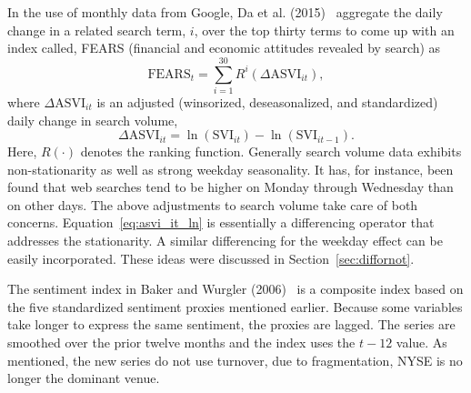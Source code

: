 In the use of monthly data from Google, Da et al. (2015)~\cite{da2015sum} aggregate the daily change in a related search term, $i$, over the top thirty terms to come up with an index called, FEARS (financial and economic attitudes revealed by search) as 
	\begin{equation} \label{eqn:fears}
	\text{FEARS}_t = \sum_{i=1}^{30} R^i (\Delta \text{ASVI}_{it}),
	\end{equation}
where $\Delta \text{ASVI}_{it}$ is an adjusted (winsorized, deseasonalized, and standardized) daily change in search volume, 
	\begin{equation} \label{eq:asvi_it_ln}
	\Delta \text{ASVI}_{it} = \ln(\text{SVI}_{it}) - \ln(\text{SVI}_{it-1}).
	\end{equation}
Here, $R(\cdot)$ denotes the ranking function. Generally search volume data exhibits non-stationarity as well as strong weekday seasonality. It has, for instance, been found that web searches tend to be higher on Monday through Wednesday than on other days. The above adjustments to search volume take care of both concerns. Equation~\ref{eq:asvi_it_ln} is essentially a differencing operator that addresses the stationarity. A similar differencing for the weekday effect can be easily incorporated. These ideas were discussed in Section~\ref{sec:diffornot}.


The sentiment index in Baker and Wurgler (2006)~\cite{baker2006investor} is a composite index based on the five standardized sentiment proxies mentioned earlier. Because some variables take longer to express the same sentiment, the proxies are lagged. The series are smoothed over the prior twelve months and the index uses the $t-12$ value. As mentioned, the new series do not use turnover, due to fragmentation, NYSE is no longer the dominant venue. 


